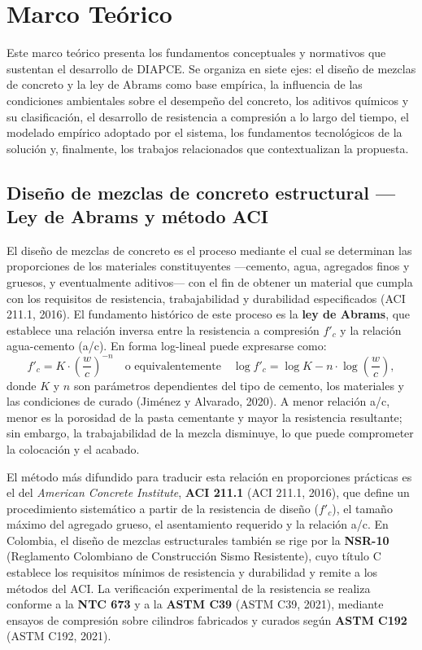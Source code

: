 \section{Marco Teórico}

Este marco teórico presenta los fundamentos conceptuales y normativos que sustentan el desarrollo de DIAPCE. Se organiza en siete ejes: el diseño de mezclas de concreto y la ley de Abrams como base empírica, la influencia de las condiciones ambientales sobre el desempeño del concreto, los aditivos químicos y su clasificación, el desarrollo de resistencia a compresión a lo largo del tiempo, el modelado empírico adoptado por el sistema, los fundamentos tecnológicos de la solución y, finalmente, los trabajos relacionados que contextualizan la propuesta.

\subsection{Diseño de mezclas de concreto estructural — Ley de Abrams y método ACI}

El diseño de mezclas de concreto es el proceso mediante el cual se determinan las proporciones de los materiales constituyentes —cemento, agua, agregados finos y gruesos, y eventualmente aditivos— con el fin de obtener un material que cumpla con los requisitos de resistencia, trabajabilidad y durabilidad especificados (ACI 211.1, 2016). El fundamento histórico de este proceso es la \textbf{ley de Abrams}, que establece una relación inversa entre la resistencia a compresión $f'_c$ y la relación agua-cemento (a/c). En forma log-lineal puede expresarse como:
\[
f'_c = K \cdot \left(\frac{w}{c}\right)^{-n}
\quad\text{o equivalentemente}\quad
\log f'_c = \log K - n \cdot \log\!\left(\frac{w}{c}\right),
\]
donde $K$ y $n$ son parámetros dependientes del tipo de cemento, los materiales y las condiciones de curado (Jiménez y Alvarado, 2020). A menor relación a/c, menor es la porosidad de la pasta cementante y mayor la resistencia resultante; sin embargo, la trabajabilidad de la mezcla disminuye, lo que puede comprometer la colocación y el acabado.

El método más difundido para traducir esta relación en proporciones prácticas es el del \textit{American Concrete Institute}, \textbf{ACI 211.1} (ACI 211.1, 2016), que define un procedimiento sistemático a partir de la resistencia de diseño ($f'_c$), el tamaño máximo del agregado grueso, el asentamiento requerido y la relación a/c. En Colombia, el diseño de mezclas estructurales también se rige por la \textbf{NSR-10} (Reglamento Colombiano de Construcción Sismo Resistente), cuyo título C establece los requisitos mínimos de resistencia y durabilidad y remite a los métodos del ACI. La verificación experimental de la resistencia se realiza conforme a la \textbf{NTC 673} y a la \textbf{ASTM C39} (ASTM C39, 2021), mediante ensayos de compresión sobre cilindros fabricados y curados según \textbf{ASTM C192} (ASTM C192, 2021).

